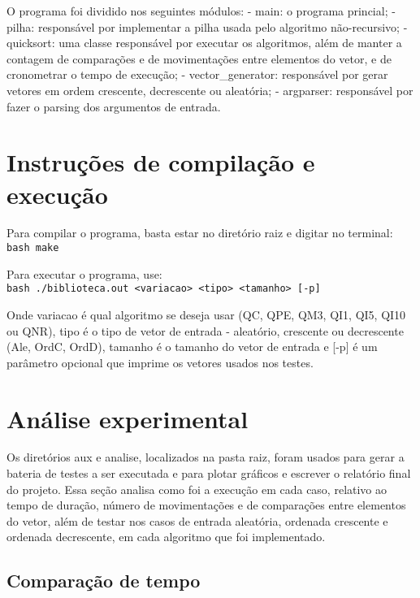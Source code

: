 \documentclass[11pt]{article}
\begin{document}
O programa foi dividido nos seguintes módulos: - main: o programa
princial; - pilha: responsável por implementar a pilha usada pelo
algoritmo não-recursivo; - quicksort: uma classe responsável por
executar os algoritmos, além de manter a contagem de comparações e de
movimentações entre elementos do vetor, e de cronometrar o tempo de
execução; - vector\_generator: responsável por gerar vetores em ordem
crescente, decrescente ou aleatória; - argparser: responsável por fazer
o parsing dos argumentos de entrada.

    \section{Instruções de compilação e
execução}\label{instruuxe7uxf5es-de-compilauxe7uxe3o-e-execuuxe7uxe3o}

Para compilar o programa, basta estar no diretório raiz e digitar no
terminal: \texttt{bash\ make}

Para executar o programa, use:
\texttt{bash\ ./biblioteca.out\ \textless{}variacao\textgreater{}\ \textless{}tipo\textgreater{}\ \textless{}tamanho\textgreater{}\ {[}-p{]}}

Onde variacao é qual algoritmo se deseja usar (QC, QPE, QM3, QI1, QI5,
QI10 ou QNR), tipo é o tipo de vetor de entrada - aleatório, crescente
ou decrescente (Ale, OrdC, OrdD), tamanho é o tamanho do vetor de
entrada e {[}-p{]} é um parâmetro opcional que imprime os vetores usados
nos testes.

    \section{Análise experimental}\label{anuxe1lise-experimental}

Os diretórios aux e analise, localizados na pasta raiz, foram usados
para gerar a bateria de testes a ser executada e para plotar gráficos e
escrever o relatório final do projeto. Essa seção analisa como foi a
execução em cada caso, relativo ao tempo de duração, número de
movimentações e de comparações entre elementos do vetor, além de testar
nos casos de entrada aleatória, ordenada crescente e ordenada
decrescente, em cada algoritmo que foi implementado.

    \subsection{Comparação de tempo}\label{comparauxe7uxe3o-de-tempo}

    \begin{center}
    \end{center}
    { \hspace*{\fill} \\}
    
\end{document}
